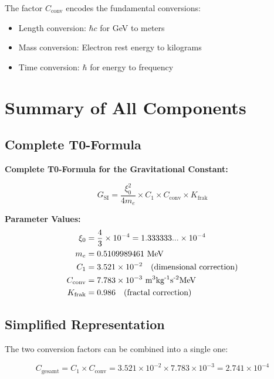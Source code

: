 \documentclass[12pt,a4paper]{article}
\begin{document}
	The factor $C_{\text{conv}}$ encodes the fundamental conversions:
	\begin{itemize}
		\item Length conversion: $\hbar c$ for GeV to meters
		\item Mass conversion: Electron rest energy to kilograms
		\item Time conversion: $\hbar$ for energy to frequency
	\end{itemize}
	
	\section{Summary of All Components}
	
	\subsection{Complete T0-Formula}
	
	\begin{keyresult}
		\textbf{Complete T0-Formula for the Gravitational Constant:}
		
		\begin{equation}
			\boxed{G_{\text{SI}} = \frac{\xi_0^2}{4 m_e} \times C_1 \times C_{\text{conv}} \times K_{\text{frak}}}
			\label{eq:G_complete_detailed}
		\end{equation}
		
		\textbf{Parameter Values:}
		\begin{align}
			\xi_0 &= \frac{4}{3} \times 10^{-4} = 1.333333... \times 10^{-4} \\
			m_e &= 0.5109989461 \text{ MeV} \\
			C_1 &= 3.521 \times 10^{-2} \quad \text{(dimensional correction)} \\
			C_{\text{conv}} &= 7.783 \times 10^{-3} \text{ m\textsuperscript{3}kg\textsuperscript{-1}s\textsuperscript{-2}MeV} \\
			K_{\text{frak}} &= 0.986 \quad \text{(fractal correction)}
		\end{align}
	\end{keyresult}
	
	\subsection{Simplified Representation}
	
	The two conversion factors can be combined into a single one:
	
	\begin{equation}
		C_{\text{gesamt}} = C_1 \times C_{\text{conv}} = 3.521 \times 10^{-2} \times 7.783 \times 10^{-3} = 2.741 \times 10^{-4}
	\end{equation}
	
\end{document}
